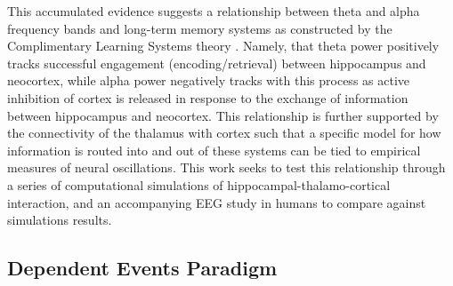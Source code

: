 \documentclass[11pt, titlepage, twoside]{article}
\begin{document}
This accumulated evidence suggests a relationship between theta and alpha frequency bands and long-term memory systems as constructed by the Complimentary Learning Systems theory \cite{McClellandMcNaughtonOReilly95,OReillyBhattacharyyaHowardEtAl14}.  Namely, that theta power positively tracks successful engagement (encoding/retrieval) between hippocampus and neocortex, while alpha power negatively tracks with this process as active inhibition of cortex is released in response to the exchange of information between hippocampus and neocortex.  This relationship is further supported by the connectivity of the thalamus with cortex such that a specific model for how information is routed into and out of these systems can be tied to empirical measures of neural oscillations.  This work seeks to test this relationship through a series of computational simulations of hippocampal-thalamo-cortical interaction, and an accompanying EEG study in humans to compare against simulations results.


\subsection{Dependent Events Paradigm}
%
%
%
\end{document}
